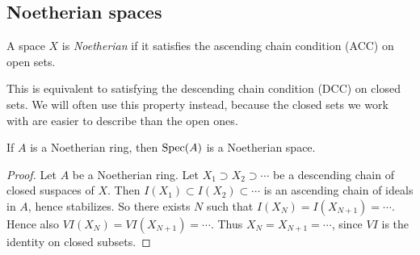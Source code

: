 \documentclass[12pt]{article}
\begin{document}

\subsection{Noetherian spaces} %

\begin{definition}
	A space $X$ is \emph{Noetherian} if it satisfies the ascending chain condition (ACC) on open sets.
\end{definition}

\begin{remark}
	This is equivalent to satisfying the descending chain condition (DCC) on closed sets. We will often use this property instead, because the closed sets we work with are easier to describe than the open ones.
\end{remark}

\begin{proposition}
\label{prop_a_noetherian_speca_noetherian}
	If $A$ is a Noetherian ring, then $\text{Spec}(A)$ is a Noetherian space.
\end{proposition}
\begin{proof}
	Let $A$ be a Noetherian ring. Let $X_1\supset X_2\supset\cdots$ be a descending chain of closed suspaces of $X$. Then $I(X_1)\subset I(X_2)\subset\cdots$ is an ascending chain of ideals in $A$, hence stabilizes. So there exists $N$ such that $I(X_N)=I(X_{N+1})=\cdots$. Hence also $VI(X_N)=VI(X_{N+1})=\cdots$. Thus $X_N=X_{N+1}=\cdots$, since $VI$ is the identity on closed subsets. 
\end{proof}
\end{document}
